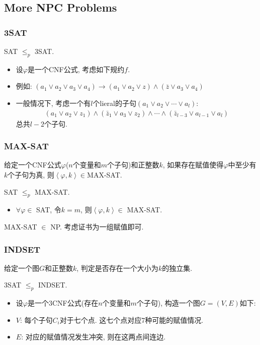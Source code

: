 \subsection{More NPC Problems}
\begin{frame}
    \frametitle{3SAT}
    SAT $\le_p$ 3SAT.
\begin{itemize}
    \item 设$\varphi$是一个CNF公式, 考虑如下规约$f$.
    \item 例如: $(a_1\lor a_2 \lor a_3 \lor a_4) \rightarrow (a_1\lor a_2 \lor z) \land (\bar{z}\lor a_3 \lor a_4)$ 
    \item 一般情况下, 考虑一个有$l$个lieral的子句$(a_1\lor a_2 \lor \cdots \lor a_l)$:
    \begin{align*}
        (a_1\lor a_2 \lor z_1) \land (\bar{z}_1\lor a_3 \lor z_2) \land \cdots \land (\bar{z}_{l-3}\lor a_{l-1}\lor a_l)
    \end{align*}
    总共$l-2$个子句.
\end{itemize}
\end{frame}
\begin{frame}
    \frametitle{MAX-SAT}
    \begin{definition}
        给定一个CNF公式$\varphi$($n$个变量和$m$个子句)和正整数$k$, 如果存在赋值使得$\varphi$中至少有$k$个子句为真, 则$\left\langle \varphi,k\right\rangle \in $MAX-SAT.
    \end{definition}
    SAT $\le_p$ MAX-SAT.
    \begin{itemize}
        \item $\forall \varphi \in$ SAT, 令$k = m$, 则$\left\langle \varphi,k\right\rangle \in$ MAX-SAT.
    \end{itemize}
    MAX-SAT $\in$ NP. 考虑证书为一组赋值即可.
\end{frame}

\begin{frame}
    \frametitle{INDSET}
    \begin{definition}[INDSET]
        给定一个图$G$和正整数$k$, 判定是否存在一个大小为$k$的独立集.
    \end{definition}
    3SAT $\le_p$ INDSET.
    \begin{itemize}
        \item 设$\varphi$是一个3CNF公式(存在$n$个变量和$m$个子句), 构造一个图$G = (V,E)$如下:
        \item $V$: 每个子句$C_i$对于七个点. 这七个点对应7种可能的赋值情况.
        \item $E$: 对应的赋值情况发生冲突, 则在这两点间连边.
    \end{itemize}
\end{frame}

